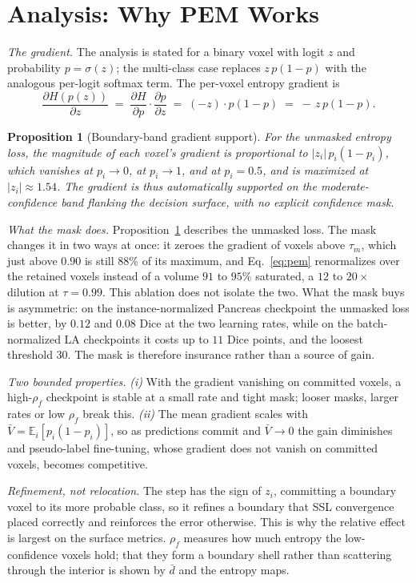 \documentclass[conference]{IEEEtran}
\newtheorem{proposition}{Proposition}
\begin{document}
\section{Analysis: Why PEM Works}
\label{sec:analysis}
\textit{The gradient.} The analysis is stated for a binary voxel with logit $z$ and probability $p=\sigma(z)$; the multi-class case replaces $z\,p(1-p)$ with the analogous per-logit softmax term. The per-voxel entropy gradient is
\begin{equation}
\frac{\partial H(p(z))}{\partial z} \;=\; \frac{\partial H}{\partial p}\cdot\frac{\partial p}{\partial z} \;=\; (-z)\cdot p(1-p) \;=\; -\,z\,p(1-p).
\label{eq:dHdz}
\end{equation}
\begin{proposition}[Boundary-band gradient support]
\label{prop:gate}
For the unmasked entropy loss, the magnitude of each voxel's gradient is proportional to $|z_i|\,p_i(1{-}p_i)$, which vanishes at $p_i\to0$, at $p_i\to1$, and at $p_i=0.5$, and is maximized at $|z_i|\approx1.54$. The gradient is thus automatically supported on the moderate-confidence band flanking the decision surface, with no explicit confidence mask.
\end{proposition}

\textit{What the mask does.} Proposition~\ref{prop:gate} describes the unmasked loss. The mask changes it in two ways at once: it zeroes the gradient of voxels above $\tau_m$, which just above $0.90$ is still $88\%$ of its maximum, and Eq.~\ref{eq:pem} renormalizes over the retained voxels instead of a volume $91$ to $95\%$ saturated, a $12$ to $20\times$ dilution at $\tau=0.99$. This ablation does not isolate the two. What the mask buys is asymmetric: on the instance-normalized Pancreas checkpoint the unmasked loss is better, by $0.12$ and $0.08$ Dice at the two learning rates, while on the batch-normalized LA checkpoints it costs up to $11$ Dice points, and the loosest threshold $30$. The mask is therefore insurance rather than a source of gain.

\textit{Two bounded properties.} \emph{(i)} With the gradient vanishing on committed voxels, a high-$\rho_f$ checkpoint is stable at a small rate and tight mask; looser masks, larger rates or low $\rho_f$ break this. \emph{(ii)} The mean gradient scales with $\bar V=\mathbb{E}_i[p_i(1{-}p_i)]$, so as predictions commit and $\bar V\to0$ the gain diminishes and pseudo-label fine-tuning, whose gradient does not vanish on committed voxels, becomes competitive.

\textit{Refinement, not relocation.} The step has the sign of $z_i$, committing a boundary voxel to its more probable class, so it refines a boundary that SSL convergence placed correctly and reinforces the error otherwise. This is why the relative effect is largest on the surface metrics. $\rho_f$ measures how much entropy the low-confidence voxels hold; that they form a boundary shell rather than scattering through the interior is shown by $\bar d$ and the entropy maps.
\end{document}
